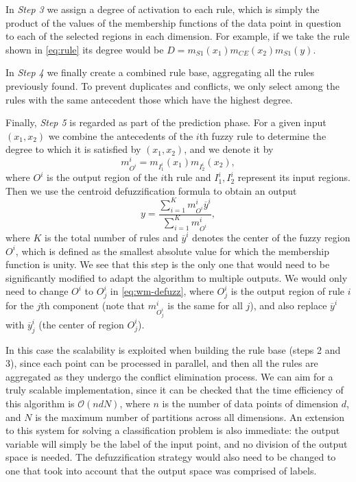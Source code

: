 In \textit{Step 3} we assign a degree of activation to each rule, which is simply the product of the values of the membership functions of the data point in question to each of the selected regions in each dimension. For example, if we take the rule shown in \eqref{eq:rule} its degree would be $D=m_{S1}(x_1)m_{CE}(x_2)m_{S1}(y)$.

In \textit{Step 4} we finally create a combined rule base, aggregating all the rules previously found. To prevent duplicates and conflicts, we only select among the rules with the same antecedent those which have the highest degree.

Finally, \textit{Step 5} is regarded as part of the prediction phase. For a given input $(x_1,x_2)$ we combine the antecedents of the $i$th fuzzy rule to determine the degree to which it is satisfied by $(x_1,x_2)$, and we denote it by
\[
m^i_{O^i} = m_{I_1^i}(x_1)m_{I_2^i}(x_2),
\]
where $O^i$ is the output region of the $i$th rule and $I_1^i, I_2^i$ represent its input regions. Then we use the centroid defuzzification formula to obtain an output
\begin{equation}\label{eq:wm-defuzz}
  y = \dfrac{\displaystyle \sum_{i=1}^K m^i_{O^i}\overbar{y}^i}{\displaystyle \sum_{i=1}^K m^i_{O^i}},
\end{equation}
where $K$ is the total number of rules and $\overbar{y}^i$ denotes the center of the fuzzy region $O^i$, which is defined as the smallest absolute value for which the membership function is unity. We see that this step is the only one that would need to be significantly modified to adapt the algorithm to multiple outputs. We would only need to change $O^i$ to $O^{i}_j$ in \eqref{eq:wm-defuzz}, where $O^{i}_j$ is the output region of rule $i$ for the $j$th component (note that $m^i_{O^i_j}$ is the same for all $j$), and also replace $\overbar{y}^i$ with $\overbar{y}^i_j$ (the center of region $O_j^{i}$).

In this case the scalability is exploited when building the rule base (steps 2 and 3), since each point can be processed in parallel, and then all the rules are aggregated as they undergo the conflict elimination process. We can aim for a truly scalable implementation, since it can be checked that the time efficiency of this algorithm is $\mathcal O (ndN)$, where $n$ is the number of data points of dimension $d$, and $N$ is the maximum number of partitions across all dimensions. An extension to this system for solving a classification problem is also immediate: the output variable will simply be the label of the input point, and no division of the output space is needed. The defuzzification strategy would also need to be changed to one that took into account that the output space was comprised of labels.

